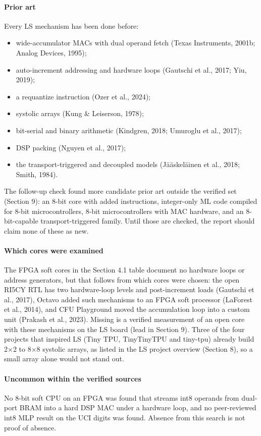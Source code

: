 \paragraph{Prior art} Every LS mechanism has been done before:
\begin{itemize}
\item wide-accumulator MACs with dual operand fetch (Texas Instruments, 2001b; Analog Devices, 1995);
\item auto-increment addressing and hardware loops (Gautschi et al., 2017; Yiu, 2019);
\item a requantize instruction (Ozer et al., 2024);
\item systolic arrays (Kung \& Leiserson, 1978);
\item bit-serial and binary arithmetic (Kindgren, 2018; Umuroglu et al., 2017);
\item DSP packing (Nguyen et al., 2017);
\item the transport-triggered and decoupled models (Jääskeläinen et al., 2018; Smith, 1984).
\end{itemize}

The follow-up check found more candidate prior art outside the verified set (Section 9): an 8-bit core with added instructions, integer-only ML code compiled for 8-bit microcontrollers, 8-bit microcontrollers with MAC hardware, and an 8-bit-capable transport-triggered family. Until those are checked, the report should claim none of these as new.

\paragraph{Which cores were examined} The FPGA soft cores in the Section 4.1 table document no hardware loops or address generators, but that follows from which cores were chosen: the open RI5CY RTL has two hardware-loop levels and post-increment loads (Gautschi et al., 2017), Octavo added such mechanisms to an FPGA soft processor (LaForest et al., 2014), and CFU Playground moved the accumulation loop into a custom unit (Prakash et al., 2023). Missing is a verified measurement of an open core with these mechanisms on the LS board (lead in Section 9). Three of the four projects that inspired LS (Tiny TPU, TinyTinyTPU and tiny-tpu) already build 2×2 to 8×8 systolic arrays, as listed in the LS project overview (Section 8), so a small array alone would not stand out.

\paragraph{Uncommon within the verified sources} No 8-bit soft CPU on an FPGA was found that streams int8 operands from dual-port BRAM into a hard DSP MAC under a hardware loop, and no peer-reviewed int8 MLP result on the UCI digits was found. Absence from this search is not proof of absence.

